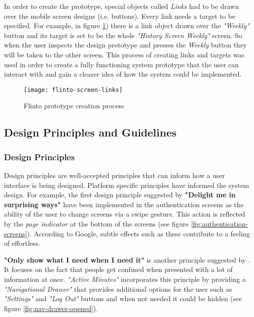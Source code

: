         In order to create the prototype, special objects called \textit{Links} had to be drawn over the mobile screen designs (i.e. buttons). Every link needs a target to be specified. For example, in figure \ref{fig:flinto_prototype}) there is a link object drawn over the \textit{"Weekly"} button and its target is set to be the whole \textit{"History Screen Weekly"} screen. So when the user inspects the design prototype and presses the \textit{Weekly} button they will be taken to the other screen. This process of creating links and targets was used in order to create a fully functioning system prototype that the user can interact with and gain a clearer idea of how the system could be implemented.
        
        \begin{figure}[ht]
            \centering
            \texttt{[image: flinto-screen-links]}
            \caption{Flinto prototype creation process}
            \label{fig:flinto_prototype}
        \end{figure}
        
        
        \subsection{Design Principles and Guidelines}
        
        \subsubsection{Design Principles}
        Design principles are well-accepted principles that can inform how a user interface is being designed. Platform specific principles have informed the system design. For example, the first design principle suggested by \citet{google2017b} \textbf{"Delight me in surprising ways"} have been implemented in the authentication screens as the ability of the user to change screens via a swipe gesture. This action is reflected by the \textit{page indicator} at the bottom of the screens (see figure \ref{fig:authentication-screens}). According to Google, subtle effects such as these contribute to a feeling of effortless. 
        
        \textbf{"Only show what I need when I need it"} is another principle suggested by \citet{google2017b}. It focuses on the fact that people get confused when presented with a lot of information at once. \textit{"Active Minutes"} incorporates this principle by providing a \textit{"Navigational Drawer"} that provides additional options for the user such as \textit{"Settings"} and \textit{"Log Out"} buttons and when not needed it could be hidden (see figure \ref{fig:nav-drawer-opened}). 
        

